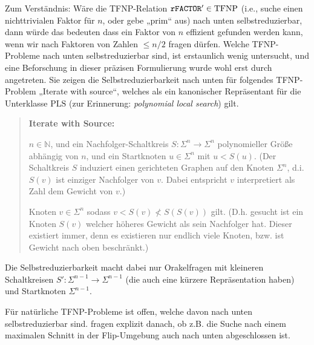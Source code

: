 Zum Verständnis: Wäre die TFNP-Relation $\mathtt{rFACTOR}'\in\mathrm{TFNP}$ (i.e., suche einen nichttrivialen Faktor für $n$, oder gebe „prim“ aus) nach unten selbstreduzierbar, dann würde das bedeuten dass ein Faktor von $n$ effizient gefunden werden kann, wenn wir nach Faktoren von Zahlen $\leq n/2$ fragen dürfen.
Welche TFNP-Probleme nach unten selbstreduzierbar sind, ist erstaunlich wenig untersucht, und eine Beforschung in dieser präzisen Formulierung wurde wohl erst durch \textcite{harsha_downward_2023} angetreten.
Sie zeigen die Selbstreduzierbarkeit nach unten für folgendes TFNP-Problem „Iterate with source“, welches als ein kanonischer Repräsentant für die Unterklasse $\mathrm{PLS}$ (zur Erinnerung: \emph{polynomial local search}) gilt.
\begin{quote}
    \textbf{Iterate with Source:}
    \begin{description}[nosep]
        \item[Gegeben:] $n\in\mathbb N$, und ein Nachfolger-Schaltkreis $S\colon\Sigma^n\to\Sigma^n$ polynomieller Größe abhängig von $n$, und ein Startknoten $u\in\Sigma^n$ mit $u<S(u)$. (Der Schaltkreis $S$ induziert einen gerichteten Graphen auf den Knoten $\Sigma^n$, d.i. $S(v)$ ist einziger Nachfolger von $v$. Dabei entspricht $v$ interpretiert als Zahl dem Gewicht von $v$.)
        \item[Gesucht:] Knoten $v\in\Sigma^n$ sodass $v<S(v)\not < S(S(v))$ gilt.
            (D.h. gesucht ist ein Knoten $S(v)$ welcher höheres Gewicht als sein Nachfolger hat. Dieser existiert immer, denn es existieren nur endlich viele Knoten, bzw. ist Gewicht nach oben beschränkt.)
    \end{description}
\end{quote}
Die Selbstreduzierbarkeit macht dabei nur Orakelfragen mit kleineren Schaltkreisen $S'\colon\Sigma^{n-1}\to\Sigma^{n-1}$ (die auch eine kürzere Repräsentation haben) und Startknoten $\Sigma^{n-1}$.

Für natürliche  TFNP-Probleme ist offen, welche davon nach unten selbstreduzierbar sind. 
\citeauthor{harsha_downward_2023} fragen explizit danach, ob z.B. die Suche nach einem maximalen Schnitt in der Flip-Umgebung auch nach unten abgeschlossen ist.



